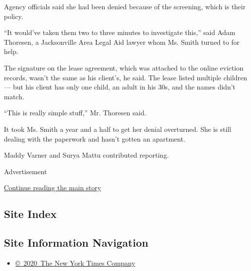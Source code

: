 Agency officials said she had been denied because of the screening,
which is their policy.

``It would've taken them two to three minutes to investigate this,''
said Adam Thoresen, a Jacksonville Area Legal Aid lawyer whom Ms. Smith
turned to for help.

The signature on the lease agreement, which was attached to the online
eviction records, wasn't the same as his client's, he said. The lease
listed multiple children --- but his client has only one child, an adult
in his 30s, and the names didn't match.

``This is really simple stuff,'' Mr. Thoresen said.

It took Ms. Smith a year and a half to get her denial overturned. She is
still dealing with the paperwork and hasn't gotten an apartment.

Maddy Varner and Surya Mattu contributed reporting.

Advertisement

\protect\hyperlink{after-bottom}{Continue reading the main story}

\hypertarget{site-index}{%
\subsection{Site Index}\label{site-index}}

\hypertarget{site-information-navigation}{%
\subsection{Site Information
Navigation}\label{site-information-navigation}}

\begin{itemize}
\tightlist
\item
  \href{https://help.nytimes3xbfgragh.onion/hc/en-us/articles/115014792127-Copyright-notice}{©~2020~The
  New York Times Company}
\end{itemize}

